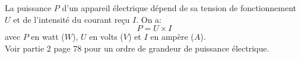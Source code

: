 \begin{mybilan}
	

		La puissance $P$ d'un appareil électrique dépend de sa tension de fonctionnement $U$ et de l'intensité du courant reçu $I$. On a: 
		\begin{equation*}
			P = U \times I
		\end{equation*}
	avec $P$ en watt ($W$), $U$ en volts ($V$) et $I$ en ampère ($A$).\\
	
	
	Voir partie 2 page 78 pour un ordre de grandeur de puissance électrique.
		 
\end{mybilan}